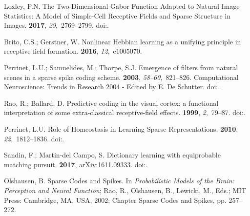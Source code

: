 \documentclass[vision,article,accept,oneauthor,pdftex]{Definitions/mdpi}
\begin{document}
\begin{thebibliography}{999}
Loxley, P.N.
\newblock The Two-Dimensional Gabor Function Adapted to Natural Image
  Statistics: A Model of Simple-Cell Receptive Fields and Sparse Structure in
  Images.
 {\bf 2017}, {\em 29},~2769--2799.
\newblock
  doi:{\href{https://doi.org/10.1162/neco_a_00997}{}}.

Brito, C.S.; Gerstner, W.
\newblock Nonlinear Hebbian learning as a unifying principle in receptive field
  formation.
 {\bf 2016}, {\em 12},~e1005070.

Perrinet, L.U.; Samuelides, M.; Thorpe, S.J.
\newblock Emergence of filters from natural scenes in a sparse spike coding
  scheme.
 {\bf 2003}, {\em 58--60},~821--826.
\newblock Computational Neuroscience: Trends in Research 2004 -
  Edited by E. De Schutter.
  doi:{\href{https://doi.org/10.1016/j.neucom.2004.01.133}{}}.

Rao, R.; Ballard, D.
\newblock Predictive coding in the visual cortex: a functional interpretation
  of some extra-classical receptive-field effects.
 {\bf 1999}, {\em 2},~79--87.
\newblock
  doi:{\href{https://doi.org/10.1038/4580}{}}.

Perrinet, L.U.
\newblock Role of Homeostasis in Learning Sparse Representations.
 {\bf 2010}, {\em 22},~1812--1836.
\newblock
  doi:{\href{https://doi.org/10.1162/neco.2010.05-08-795}{}}.

Sandin, F.; Martin-del Campo, S.
\newblock Dictionary learning with equiprobable matching pursuit.
 {\bf 2017}, arXiv:1611.09333.
\newblock
  doi:{\href{https://doi.org/10.1109/IJCNN.2017.7965902}{}}.

Olshausen, B.
\newblock Sparse Codes and Spikes. In {\em Probabilistic {M}odels of the
  {B}rain: {P}erception and {N}eural {F}unction}; Rao, R., Olshausen, B.,
  Lewicki, M., Eds.; MIT Press: Cambridge, MA, USA,  2002; Chapter Sparse Codes and Spikes, pp.
  257--272.


\end{thebibliography}
\end{document}
